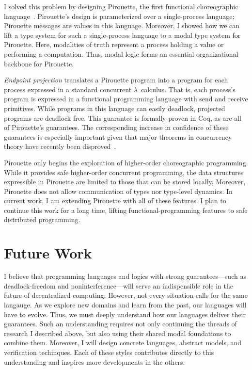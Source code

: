 \documentclass{article}
\theoremstyle{definition}
\begin{document}
I solved this problem by designing Pirouette, the first functional choreographic language~\citep{HirschG22}.
Pirouette's design is parameterized over a single-process language; Pirouette messages are values in this language.
Moreover, I showed how we can lift a type system for such a single-process language to a modal type system for Pirouette.
Here, modalities of truth represent a process holding a value or performing a computation.
Thus, modal logic forms an essential organizational backbone for Pirouette.

\emph{Endpoint projection} translates a Pirouette program into a program for each process expressed in a standard concurrent $\lambda$~calculus.
That is, each process's program is expressed in a functional programming language with \textsf{send} and \textsf{receive} primitives.
While programs in this language can easily deadlock, projected programs are deadlock free.
This guarantee is formally proven in Coq, as are all of Pirouette's guarantees.
The corresponding increase in confidence of these guarantees is especially important given that major theorems in concurrency theory have recently been disproved~\citep{Cruz-FilipeMP19}.

Pirouette only begins the exploration of higher-order choreographic programming.
While it provides safe higher-order concurrent programming, the data structures expressible in Pirouette are limited to those that can be stored locally.
Moreover, Pirouette does not allow communication of types nor type-level dynamics.
In current work, I am extending Pirouette with all of these features.
I plan to continue this work for a long time, lifting functional-programming features to safe distributed programming.

\section*{Future Work}

I believe that programming languages and logics with strong guarantees---such as deadlock-freedom and noninterference---will serve an indispensible role in the future of decentralized computing.
However, not every situation calls for the same langauge.
As we explore new domains and learn from the past, our languages will have to evolve.
Thus, we must deeply understand how our languages deliver their guarantees.
Such an understanding requires not only continuing the threads of research I described above, but also using their shared modal foundations to combine them.
Moreover, I will design concrete languages, abstract models, and verification techinques.
Each of these styles contributes directly to this understanding and inspires more developments in the others.
\end{document}
